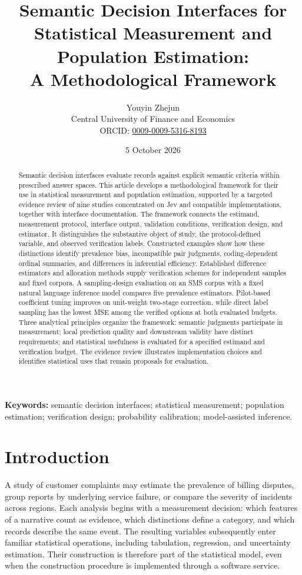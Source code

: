 \documentclass[11pt,a4paper]{article}
\title{\bfseries Semantic Decision Interfaces for Statistical Measurement and Population Estimation:\\A Methodological Framework}
\author{Youyin Zhejun\\[0.35em]
\small Central University of Finance and Economics\\
\small ORCID: \href{https://orcid.org/0009-0009-5316-8193}{0009-0009-5316-8193}}
\date{5 October 2026}
\begin{document}
\maketitle
\thispagestyle{plain}
\begin{abstract}
Semantic decision interfaces evaluate records against explicit semantic criteria within prescribed answer spaces. This article develops a methodological framework for their use in statistical measurement and population estimation, supported by a targeted evidence review of nine studies concentrated on Jev and compatible implementations, together with interface documentation. The framework connects the estimand, measurement protocol, interface output, validation conditions, verification design, and estimator. It distinguishes the substantive object of study, the protocol-defined variable, and observed verification labels. Constructed examples show how these distinctions identify prevalence bias, incompatible pair judgments, coding-dependent ordinal summaries, and differences in inferential efficiency. Established difference estimators and allocation methods supply verification schemes for independent samples and fixed corpora. A sampling-design evaluation on an SMS corpus with a fixed natural language inference model compares five prevalence estimators. Pilot-based coefficient tuning improves on unit-weight two-stage correction, while direct label sampling has the lowest MSE among the verified options at both evaluated budgets. Three analytical principles organize the framework: semantic judgments participate in measurement; local prediction quality and downstream validity have distinct requirements; and statistical usefulness is evaluated for a specified estimand and verification budget. The evidence review illustrates implementation choices and identifies statistical uses that remain proposals for evaluation.
\end{abstract}
\noindent\textbf{Keywords:} semantic decision interfaces; statistical measurement; population estimation; verification design; probability calibration; model-assisted inference.

\section{Introduction}\label{sec:intro}

A study of customer complaints may estimate the prevalence of billing disputes, group reports by underlying service failure, or compare the severity of incidents across regions. Each analysis begins with a measurement decision: which features of a narrative count as evidence, which distinctions define a category, and which records describe the same event. The resulting variables subsequently enter familiar statistical operations, including tabulation, regression, and uncertainty estimation. Their construction is therefore part of the statistical model, even when the construction procedure is implemented through a software service.
\end{document}
